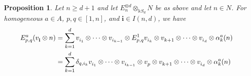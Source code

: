 \documentclass[11pt,reqno]{amsart} %
\newtheorem{proposition}[theorem]{Proposition}
\renewcommand{\k}{\mathds{k}}
\newcommand{\0}{\bar{0}}
\newcommand{\1}{\bar{1}}
\newcommand{\bi}{\mathbf{i}}
\numberwithin{equation}{subsection}
\begin{document}
\begin{proposition}\label{P:compatibile-actions} Let $n \geq d+1$ and let $E_{n}^{\otimes d} \otimes_{\k S_{d}} N$ be as above and let $n \in N$. For homogeneous $a \in A$, $p,q \in [1,n]$, and $\bi \in I(n,d)$, we have 
\begin{align}\label{E:action}
E^{a}_{p,q} (v^{}_{\bi}\otimes n) &=  \sum_{k=1}^{d} v^{}_{i_{1}} \otimes \dotsb \otimes v^{}_{i_{k-1}}\otimes  E^{1}_{p,q} v^{}_{i_{k}} \otimes v^{}_{k+1} \otimes \dotsb \otimes v^{}_{i_{d}} \otimes \alpha^{a}_{k}(n) \\ \notag
&= \sum_{k=1}^{d} \delta_{q, i_{k}} v^{}_{i_{1}} \otimes \dotsb \otimes v^{}_{i_{k-1}}\otimes   v^{}_{p} \otimes v^{}_{k+1} \otimes \dotsb \otimes v^{}_{i_{d}} \otimes \alpha^{a}_{k}(n) 
\end{align}

\end{proposition}
\end{document}
